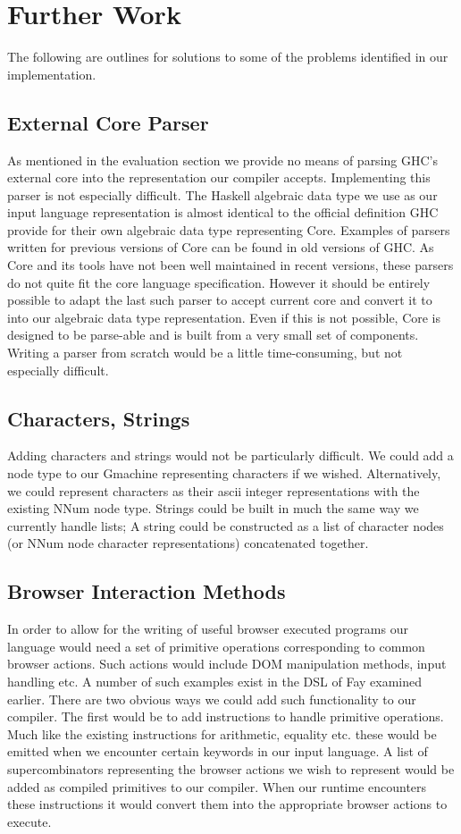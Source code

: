 \section{Further Work}
The following are outlines for solutions to some of
the problems identified in our implementation.

\subsection{External Core Parser}
As mentioned in the evaluation section we provide no means of
parsing GHC's external core into the representation our compiler accepts.
Implementing this parser is not especially difficult. The Haskell
algebraic data type we use as our input language representation is
almost identical to the official definition GHC provide
for their own algebraic data type representing Core. Examples of
parsers written for previous versions of Core can be found in old
versions of GHC. As Core and its tools have not been well maintained 
in recent versions, these parsers do not quite fit the core language
specification. However it should be entirely possible to adapt the 
last such parser to accept current core and convert it to into our 
algebraic data type representation. Even if this is not possible, Core
is designed to be parse-able and is built from a very small set of 
components. Writing a parser from scratch would be a little 
time-consuming, but not especially difficult.

\subsection{Characters, Strings}
Adding characters and strings would not be particularly difficult.
We could add a node type to our Gmachine representing characters if
we wished. Alternatively, we could represent characters as their
ascii integer representations with the existing NNum node type. 
Strings could be built in much the same way we currently handle
lists; A string could be constructed as a list of character nodes
(or NNum node character representations) concatenated together. 

\subsection{Browser Interaction Methods}
In order to allow for the writing of useful browser executed programs
our language would need a set of primitive operations corresponding
to common browser actions. Such actions would include DOM manipulation
methods, input handling etc. A number of such examples exist in the
DSL of Fay examined earlier. There are two obvious ways we could add such 
functionality to our compiler. The first would be to add instructions to
handle primitive operations. Much like the existing instructions for
arithmetic, equality etc. these would be emitted when we encounter 
certain keywords in our input language. A list of supercombinators
representing the browser actions we wish to represent would be added
as compiled primitives to our compiler. When our runtime encounters
these instructions it would convert them into the appropriate browser
actions to execute. 

